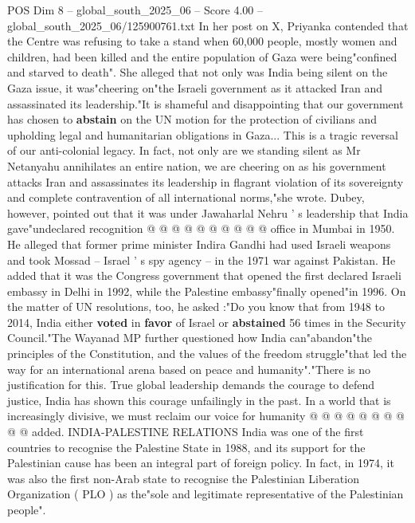 \begin{textsample}{POS Dim 8 – global\_south\_2025\_06 – Score 4.00 – global\_south\_2025\_06/125900761.txt}  \label{ex:f8_pos_427}
In her post on X, Priyanka contended that the Centre was refusing to take a stand when 60,000 people, mostly women and children, had been killed and the entire population of Gaza were being"confined and starved to death".
She alleged that not only was India being silent on the Gaza issue, it was"cheering on"the Israeli government as it attacked Iran and assassinated its leadership."It is shameful and disappointing that our government has chosen to \textbf{abstain} on the UN motion for the protection of civilians and upholding legal and humanitarian obligations in Gaza...
This is a tragic reversal of our anti-colonial legacy.
In fact, not only are we standing silent as Mr Netanyahu annihilates an entire nation, we are cheering on as his government attacks Iran and assassinates its leadership in flagrant violation of its sovereignty and complete contravention of all international norms,"she wrote.
Dubey, however, pointed out that it was under Jawaharlal Nehru ' s leadership that India gave"undeclared recognition @ @ @ @ @ @ @ @ @ @ office in Mumbai in 1950.
He alleged that former prime minister Indira Gandhi had used Israeli weapons and took Mossad -- Israel ' s spy agency -- in the 1971 war against Pakistan.
He added that it was the Congress government that opened the first declared Israeli embassy in Delhi in 1992, while the Palestine embassy"finally opened"in 1996.
On the matter of UN resolutions, too, he asked :"Do you know that from 1948 to 2014, India either \textbf{voted} in \textbf{favor} of Israel or \textbf{abstained} 56 times in the Security Council."The Wayanad MP further questioned how India can"abandon"the principles of the Constitution, and the values of the freedom struggle"that led the way for an international arena based on peace and humanity"."There is no justification for this.
True global leadership demands the courage to defend justice, India has shown this courage unfailingly in the past.
In a world that is increasingly divisive, we must reclaim our voice for humanity @ @ @ @ @ @ @ @ @ @ added.
INDIA-PALESTINE RELATIONS India was one of the first countries to recognise the Palestine State in 1988, and its support for the Palestinian cause has been an integral part of foreign policy.
In fact, in 1974, it was also the first non-Arab state to recognise the Palestinian Liberation Organization ( PLO ) as the"sole and legitimate representative of the Palestinian people".

\end{textsample}
